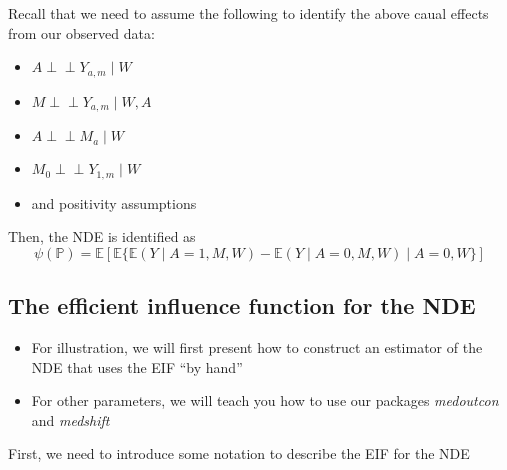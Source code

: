 \documentclass[
  12pt,
]{book}
\providecommand{\tightlist}{%
  \setlength{\itemsep}{0pt}\setlength{\parskip}{0pt}}
\theoremstyle{definition}
\theoremstyle{definition}
\theoremstyle{definition}
\newcommand{\indep}{\mbox{$\perp\!\!\!\perp$}}
\renewcommand{\P}{\mathbb{P}}
\newcommand{\E}{\mathbb{E}}
\newcommand{\1}{\mathbbm{1}}
\begin{document}
Recall that we need to assume the following to identify the above caual effects
from our observed data:

\begin{itemize}
\tightlist
\item
  \(A \indep Y_{a,m} \mid W\)
\item
  \(M \indep Y_{a,m} \mid W, A\)
\item
  \(A \indep M_a \mid W\)
\item
  \(M_0 \indep Y_{1,m} \mid W\)
\item
  and positivity assumptions
\end{itemize}

Then, the NDE is identified as
\begin{equation*}
    \psi(\P) =  \E[\E\{\E(Y \mid A=1, M, W) - \E(Y \mid A=0, M, W)\mid A=0,W\}]
  \end{equation*}

\hypertarget{the-efficient-influence-function-for-the-nde}{%
\subsection{The efficient influence function for the NDE}\label{the-efficient-influence-function-for-the-nde}}

\begin{itemize}
\tightlist
\item
  For illustration, we will first present how to construct an estimator of the
  NDE that uses the EIF ``by hand''
\item
  For other parameters, we will teach you how to use our packages \emph{medoutcon}
  and \emph{medshift}
\end{itemize}

First, we need to introduce some notation to describe the EIF for the NDE
\end{document}
